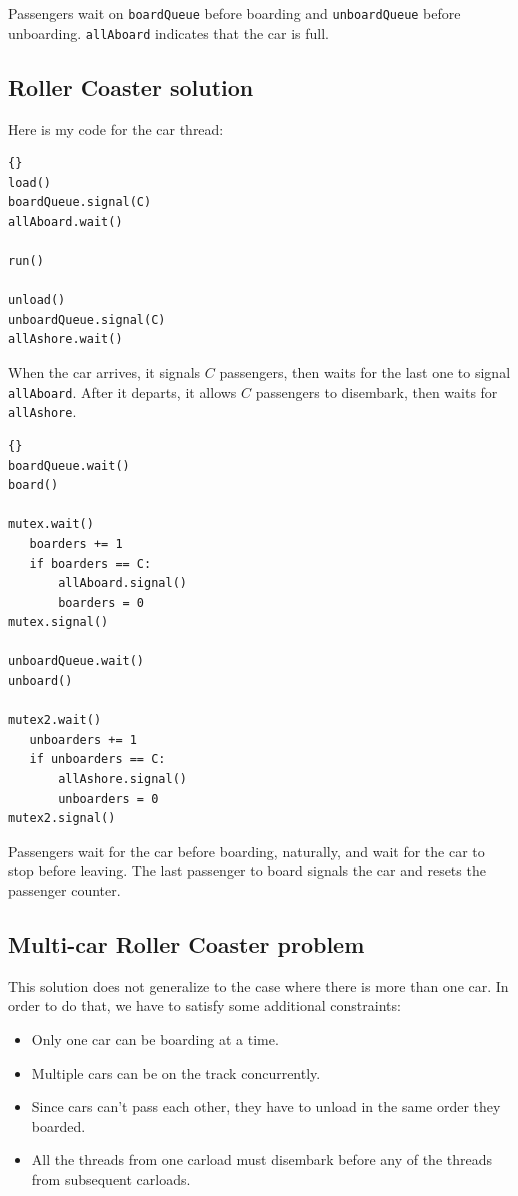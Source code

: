 \documentclass{book}
\begin{document}
Passengers wait on {\tt boardQueue} before boarding and
    {\tt unboardQueue} before unboarding.  {\tt allAboard}
indicates that the car is full.



\subsection{Roller Coaster solution}

Here is my code for the car thread:

\begin{lstlisting}[title={Roller Coaster solution (car)}]{}
load()
boardQueue.signal(C)
allAboard.wait()

run()

unload()
unboardQueue.signal(C)
allAshore.wait()
\end{lstlisting}

When the car arrives, it signals $C$ passengers,
then waits for the last one to signal {\tt allAboard}.
After it departs, it allows $C$ passengers to disembark,
then waits for {\tt allAshore}.

\newpage
\begin{lstlisting}[title={Roller Coaster solution (passenger)}]{}
boardQueue.wait()
board()

mutex.wait()
   boarders += 1
   if boarders == C:
       allAboard.signal()
       boarders = 0
mutex.signal()

unboardQueue.wait()
unboard()

mutex2.wait()
   unboarders += 1
   if unboarders == C:
       allAshore.signal()
       unboarders = 0
mutex2.signal()
\end{lstlisting}

Passengers wait for the car before boarding, naturally, and wait for
the car to stop before leaving.  The last passenger to board signals
the car and resets the passenger counter.



\subsection{Multi-car Roller Coaster problem}

This solution does not generalize to the case where there is more
than one car.  In order to do that, we have to satisfy some additional
constraints:

\begin{itemize}
    \item Only one car can be boarding at a time.
    \item Multiple cars can be on the track concurrently.
    \item Since cars can't pass each other, they have to unload
          in the same order they boarded.
    \item All the threads from one carload must disembark before
          any of the threads from subsequent carloads.

\end{itemize}
\end{document}
